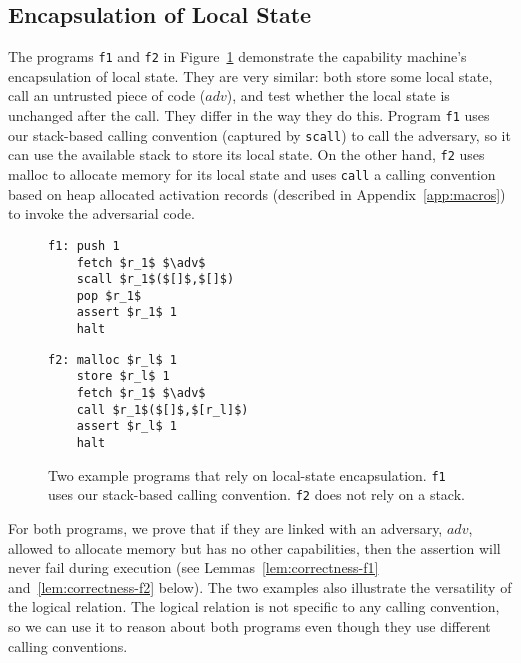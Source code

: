 \documentclass[format=acmsmall, review=true, screen=true]{acmart}
\renewcommand{\figurename}{Figure}
\newcommand\lau[1]{{\color{purple} \sf \footnotesize {LS: #1}}\\}
\newcommand\lars[1]{{\color{purple} \sf \footnotesize {LB: #1}}\\}
\renewcommand\lau[1]{}
\renewcommand\lars[1]{}
\newcommand{\var}[1]{\mathit{#1}}
\newcommand{\adv}{\var{adv}}
\begin{document}
\subsection{Encapsulation of Local State}
The programs \texttt{f1} and \texttt{f2} in \figurename~\ref{fig:prog-f1-and-f2} demonstrate the capability machine's encapsulation of local state.
They are very similar: both store some local state, call an untrusted piece of code ($\adv$), and test whether the local state is unchanged after the call.
They differ in the way they do this.
Program \texttt{f1} uses our stack-based calling convention (captured by \texttt{scall}) to call the adversary, so it can use the available stack to store its local state.
On the other hand, \texttt{f2} uses malloc to allocate memory for its local state and uses \texttt{call} a calling convention based on heap allocated activation records (described in Appendix~\ref{app:macros}) to invoke the adversarial code.

\begin{figure}[t]
  \centering

  \begin{minipage}[t]{4.1cm}
  \begin{lstlisting}
f1: push 1
    fetch $r_1$ $\adv$
    scall $r_1$($[]$,$[]$)
    pop $r_1$
    assert $r_1$ 1
    halt
  \end{lstlisting}
  \end{minipage}
  \begin{minipage}[t]{4.1cm}
  \begin{lstlisting}
f2: malloc $r_l$ 1
    store $r_l$ 1
    fetch $r_1$ $\adv$
    call $r_1$($[]$,$[r_l]$)
    assert $r_l$ 1
    halt
  \end{lstlisting}
  \end{minipage}
  \caption{Two example programs that rely on local-state encapsulation. \texttt{f1} uses our stack-based calling convention. \texttt{f2} does not rely on a stack.}
  \label{fig:prog-f1-and-f2}
\end{figure}

For both programs, we prove that if they are linked with an adversary,
$\adv$, allowed to allocate memory but has no other capabilities, then
the assertion will never fail during execution (see
Lemmas~\ref{lem:correctness-f1} and~\ref{lem:correctness-f2} below).
The two examples also illustrate the versatility of the logical relation.
The logical relation is not specific to any calling convention, so we can use it to reason
about both programs even though they use different calling conventions.
\end{document}
